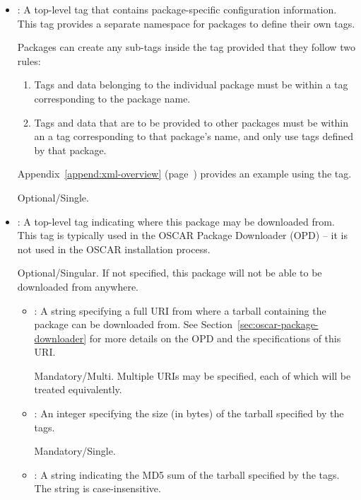 \begin{itemize}
\begin{itemize}
  \end{itemize}

\item {}: A top-level tag that contains package-specific
  configuration information.  This tag provides a separate namespace
  for packages to define their own tags.

  Packages can create any sub-tags inside the  tag
  provided that they follow two rules:

  \begin{enumerate}
  \item Tags and data belonging to the individual package must be
    within a tag corresponding to the package name.
    
  \item Tags and data that are to be provided to other packages must
    be within an a tag corresponding to that package's name, and only
    use tags defined by that package.
  \end{enumerate}
  
  Appendix~\ref{append:xml-overview}
  (page~\pageref{append:xml-overview}) provides an example using the
   tag.

  Optional/Single.

\item {}: A top-level tag indicating where this package
  may be downloaded from.  This tag is typically used in the OSCAR
  Package Downloader (OPD) -- it is not used in the OSCAR installation
  process.
  
  Optional/Singular.  If not specified, this package will not be able
  to be downloaded from anywhere. 

  \begin{itemize}
  \item {}: A string specifying a full URI from where a
    tarball containing the package can be downloaded from.  See
    Section~\ref{sec:oscar-package-downloader} for more details on the
    OPD and the specifications of this URI.

    Mandatory/Multi.  Multiple URIs may be specified, each of which
    will be treated equivalently.  
    
  \item {}: An integer specifying the size (in bytes) of
    the tarball specified by the  tags.

    Mandatory/Single.
    
  \item {}: A string indicating the MD5 sum of the
    tarball specified by the  tags.  The string is
    case-insensitive. 
    

\end{itemize}
\end{itemize}

